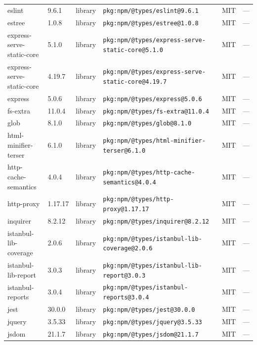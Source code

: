 \documentclass[11pt,a4paper]{article}
\begin{document}
\begin{longtable}{|p{4cm}|p{2cm}|p{1.6cm}|p{5cm}|p{1.5cm}|p{3.5cm}|}
\raggedright eslint & 9.6.1 & library & \small\texttt{pkg:npm/@types/eslint@9.6.1} & MIT & \small — \\
\raggedright estree & 1.0.8 & library & \small\texttt{pkg:npm/@types/estree@1.0.8} & MIT & \small — \\
\raggedright express-serve-static-core & 5.1.0 & library & \small\texttt{pkg:npm/@types/express-serve-static-core@5.1.0} & MIT & \small — \\
\raggedright express-serve-static-core & 4.19.7 & library & \small\texttt{pkg:npm/@types/express-serve-static-core@4.19.7} & MIT & \small — \\
\raggedright express & 5.0.6 & library & \small\texttt{pkg:npm/@types/express@5.0.6} & MIT & \small — \\
\raggedright fs-extra & 11.0.4 & library & \small\texttt{pkg:npm/@types/fs-extra@11.0.4} & MIT & \small — \\
\raggedright glob & 8.1.0 & library & \small\texttt{pkg:npm/@types/glob@8.1.0} & MIT & \small — \\
\raggedright html-minifier-terser & 6.1.0 & library & \small\texttt{pkg:npm/@types/html-minifier-terser@6.1.0} & MIT & \small — \\
\raggedright http-cache-semantics & 4.0.4 & library & \small\texttt{pkg:npm/@types/http-cache-semantics@4.0.4} & MIT & \small — \\
\raggedright http-proxy & 1.17.17 & library & \small\texttt{pkg:npm/@types/http-proxy@1.17.17} & MIT & \small — \\
\raggedright inquirer & 8.2.12 & library & \small\texttt{pkg:npm/@types/inquirer@8.2.12} & MIT & \small — \\
\raggedright istanbul-lib-coverage & 2.0.6 & library & \small\texttt{pkg:npm/@types/istanbul-lib-coverage@2.0.6} & MIT & \small — \\
\raggedright istanbul-lib-report & 3.0.3 & library & \small\texttt{pkg:npm/@types/istanbul-lib-report@3.0.3} & MIT & \small — \\
\raggedright istanbul-reports & 3.0.4 & library & \small\texttt{pkg:npm/@types/istanbul-reports@3.0.4} & MIT & \small — \\
\raggedright jest & 30.0.0 & library & \small\texttt{pkg:npm/@types/jest@30.0.0} & MIT & \small — \\
\raggedright jquery & 3.5.33 & library & \small\texttt{pkg:npm/@types/jquery@3.5.33} & MIT & \small — \\
\raggedright jsdom & 21.1.7 & library & \small\texttt{pkg:npm/@types/jsdom@21.1.7} & MIT & \small — \\

\end{longtable}
\end{document}
